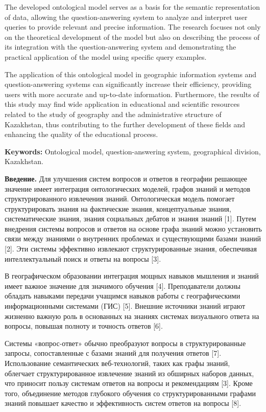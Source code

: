 The developed ontological model serves as a basis for the semantic
representation of data, allowing the question-answering system to
analyze and interpret user queries to provide relevant and precise
information. The research focuses not only on the theoretical
development of the model but also on describing the process of its
integration with the question-answering system and demonstrating the
practical application of the model using specific query examples.

The application of this ontological model in geographic information
systems and question-answering systems can significantly increase their
efficiency, providing users with more accurate and up-to-date
information. Furthermore, the results of this study may find wide
application in educational and scientific resources related to the study
of geography and the administrative structure of Kazakhstan, thus
contributing to the further development of these fields and enhancing
the quality of the educational process.

\textbf{Keywords:} Ontological model, question-answering system,
geographical division, Kazakhstan.

\textbf{Введение.} Для улучшения систем вопросов и ответов в географии
решающее значение имеет интеграция онтологических моделей, графов знаний
и методов структурированного извлечения знаний. Онтологическая модель
помогает структурировать знания на фактические знания, концептуальные
знания, систематические знания, знания социальных дебатов и знания
знаний {[}1{]}. Путем внедрения системы вопросов и ответов на основе
графа знаний можно установить связи между знаниями о внутренних
проблемах и существующими базами знаний {[}2{]}. Эти системы эффективно
извлекают структурированные знания, обеспечивая интеллектуальный поиск и
ответы на вопросы {[}3{]}.

В географическом образовании интеграция мощных навыков мышления и знаний
имеет важное значение для значимого обучения {[}4{]}. Преподаватели
должны обладать навыками передачи учащимся навыков работы с
географическими информационными системами (ГИС) {[}5{]}. Внешние
источники знаний играют жизненно важную роль в основанных на знаниях
системах визуального ответа на вопросы, повышая полноту и точность
ответов {[}6{]}.

Системы «вопрос-ответ» обычно преобразуют вопросы в структурированные
запросы, сопоставленные с базами знаний для получения ответов {[}7{]}.
Использование семантических веб-технологий, таких как графы знаний,
облегчает структурированное извлечение знаний из обширных наборов
данных, что приносит пользу системам ответов на вопросы и рекомендациям
{[}3{]}. Кроме того, объединение методов глубокого обучения со
структурированными графами знаний повышает качество и эффективность
систем ответов на вопросы {[}8{]}.

